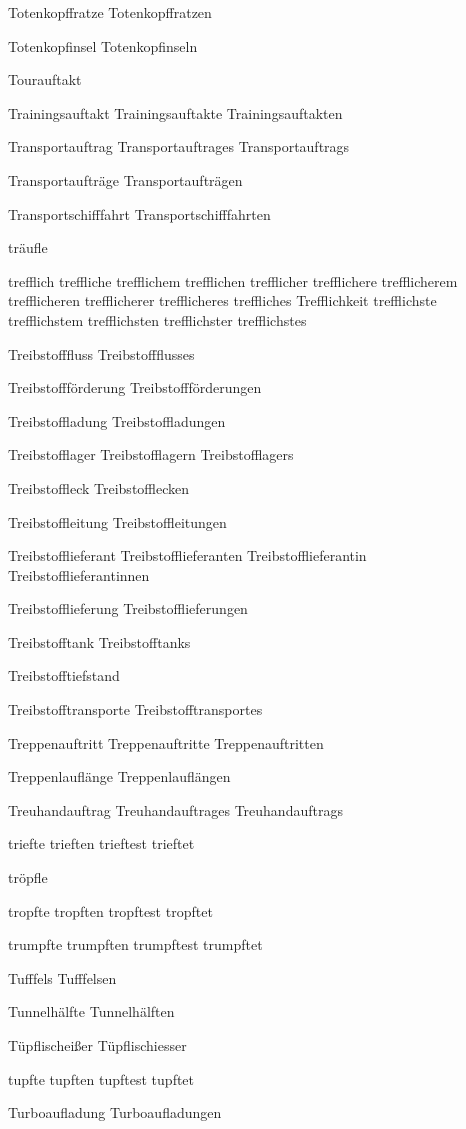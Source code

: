 Totenkopffratze
Totenkopffratzen

Totenkopfinsel
Totenkopfinseln

Tourauftakt

Trainingsauftakt
Trainingsauftakte
Trainingsauftakten

Transportauftrag
Transportauftrages
Transportauftrags

Transportaufträge
Transportaufträgen

Transportschifffahrt
Transportschifffahrten

träufle

trefflich
treffliche
trefflichem
trefflichen
trefflicher
trefflichere
trefflicherem
trefflicheren
trefflicherer
trefflicheres
treffliches
Trefflichkeit
trefflichste
trefflichstem
trefflichsten
trefflichster
trefflichstes

Treibstofffluss
Treibstoffflusses

Treibstoffförderung
Treibstoffförderungen

Treibstoffladung
Treibstoffladungen

Treibstofflager
Treibstofflagern
Treibstofflagers

Treibstoffleck
Treibstofflecken

Treibstoffleitung
Treibstoffleitungen

Treibstofflieferant
Treibstofflieferanten
Treibstofflieferantin
Treibstofflieferantinnen

Treibstofflieferung
Treibstofflieferungen

Treibstofftank
Treibstofftanks

Treibstofftiefstand

Treibstofftransporte
Treibstofftransportes

Treppenauftritt
Treppenauftritte
Treppenauftritten

Treppenlauflänge
Treppenlauflängen

Treuhandauftrag
Treuhandauftrages
Treuhandauftrags

triefte
trieften
trieftest
trieftet

tröpfle

tropfte
tropften
tropftest
tropftet

trumpfte
trumpften
trumpftest
trumpftet

Tufffels
Tufffelsen

Tunnelhälfte
Tunnelhälften

Tüpflischeißer 
Tüpflischiesser

tupfte
tupften
tupftest
tupftet

Turboaufladung
Turboaufladungen

